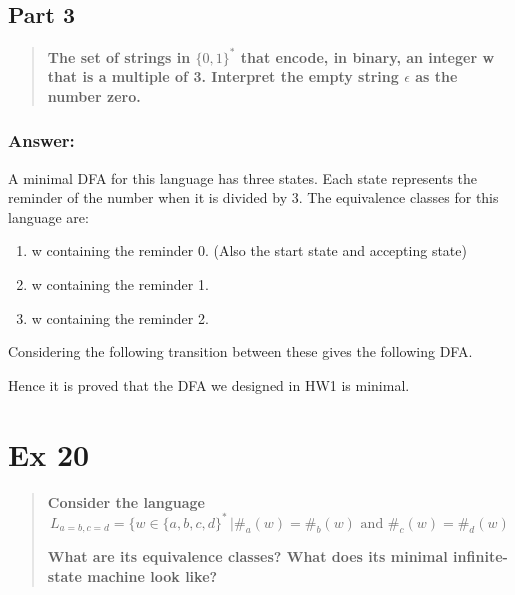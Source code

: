 \documentclass[titlepage]{article}\usepackage[]{graphicx}\usepackage[]{color}
\begin{document}
  \subsection*{Part 3}
  \begin{quote}
	  \textbf{ The set of strings in $\{0,1\}^*$ that encode, in binary,
  an integer w that is a multiple of 3. Interpret the empty string $\epsilon$
  as the number zero. }
  \end{quote}
  \subsubsection{Answer:}
  A minimal DFA for this language has three states. Each state represents the
  reminder of the number when it is divided by 3.
  The equivalence classes for this language are:  
  \begin{enumerate}
	\item  w containing the reminder 0. (Also the start state and accepting state)
	\item  w containing the reminder 1.
	\item  w containing the reminder 2.
\end{enumerate}
  Considering the following transition between these gives the following DFA.


Hence it is proved that the DFA we designed in HW1 is minimal. 


\section*{Ex 20}
\begin{quote}
  \textbf{Consider the language}
  \[ L_{a=b,c=d } = \{ w \in \{a,b, c ,d \}^* \, | \#_a (w) = \#_b (w) \text{ and }
    \#_c (w) = \#_d (w )
  \]
  
\textbf{What are its equivalence classes? What does its minimal infinite-state machine
look like?}
\end{quote}
\end{document}
